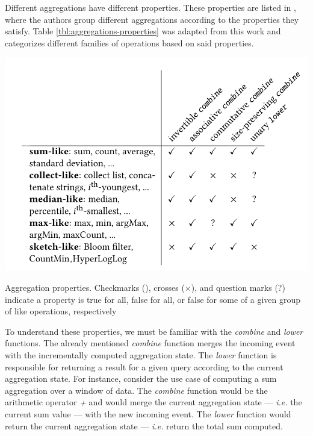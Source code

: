 Different aggregations have different properties. These properties are listed in \cite{Tangwongsan-Sliding-Window-Aggregation-Algorithms}, where the authors group different aggregations according to the properties they satisfy. Table \ref{tbl:aggregations-properties} was adapted from this work and categorizes different families of operations based on said properties.

\begin{table}[!htb]
    \begin{center}
      \includegraphics[scale=0.5]{figures/aggregation-operations-properties.png}
      \caption[Aggregation properties]{Aggregation properties. Checkmarks (\checkmark), crosses ($\times$), and question marks (?) indicate a property is true for all, false for all, or false for some of a given group of like operations, respectively}
      \label{tbl:aggregations-properties}
    \end{center}
\end{table}

To understand these properties, we must be familiar with the \textit{combine} and \textit{lower} functions. The already mentioned \textit{combine} function merges the incoming event with the incrementally computed aggregation state. The \textit{lower} function is responsible for returning a result for a given query according to the current aggregation state. For instance, consider the use case of computing a sum aggregation over a window of data. The \textit{combine} function would be the arithmetic operator \textit{+} and would merge the current aggregation state --- \textit{i.e.} the current sum value --- with the new incoming event. The \textit{lower} function would return the current aggregation state --- \textit{i.e.} return the total sum computed.

